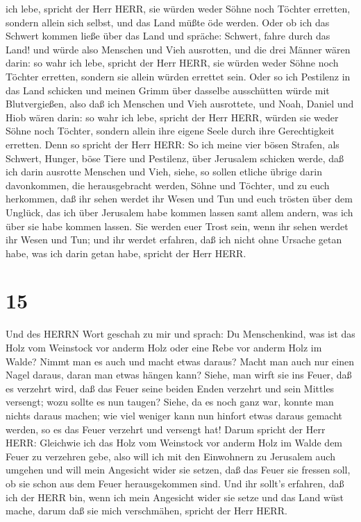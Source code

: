 ich lebe, spricht der Herr HERR, sie würden weder Söhne noch Töchter
erretten, sondern allein sich selbst, und das Land müßte öde werden.
 Oder ob ich das Schwert kommen ließe über das Land und
spräche: Schwert, fahre durch das Land! und würde also Menschen und Vieh
ausrotten,  und die drei Männer wären darin: so wahr ich
lebe, spricht der Herr HERR, sie würden weder Söhne noch Töchter
erretten, sondern sie allein würden errettet sein.  Oder so
ich Pestilenz in das Land schicken und meinen Grimm über dasselbe
ausschütten würde mit Blutvergießen, also daß ich Menschen und Vieh
ausrottete,  und Noah, Daniel und Hiob wären darin: so wahr
ich lebe, spricht der Herr HERR, würden sie weder Söhne noch Töchter,
sondern allein ihre eigene Seele durch ihre Gerechtigkeit erretten.
 Denn so spricht der Herr HERR: So ich meine vier bösen
Strafen, als Schwert, Hunger, böse Tiere und Pestilenz, über Jerusalem
schicken werde, daß ich darin ausrotte Menschen und Vieh, 
siehe, so sollen etliche übrige darin davonkommen, die herausgebracht
werden, Söhne und Töchter, und zu euch herkommen, daß ihr sehen werdet
ihr Wesen und Tun und euch trösten über dem Unglück, das ich über
Jerusalem habe kommen lassen samt allem andern, was ich über sie habe
kommen lassen.  Sie werden euer Trost sein, wenn ihr sehen
werdet ihr Wesen und Tun; und ihr werdet erfahren, daß ich nicht ohne
Ursache getan habe, was ich darin getan habe, spricht der Herr HERR.

\hypertarget{section-14}{%
\section{15}\label{section-14}}

 Und des HERRN Wort geschah zu mir und sprach: 
Du Menschenkind, was ist das Holz vom Weinstock vor anderm Holz oder
eine Rebe vor anderm Holz im Walde?  Nimmt man es auch und
macht etwas daraus? Macht man auch nur einen Nagel daraus, daran man
etwas hängen kann?  Siehe, man wirft sie ins Feuer, daß es
verzehrt wird, daß das Feuer seine beiden Enden verzehrt und sein
Mittles versengt; wozu sollte es nun taugen?  Siehe, da es
noch ganz war, konnte man nichts daraus machen; wie viel weniger kann
nun hinfort etwas daraus gemacht werden, so es das Feuer verzehrt und
versengt hat!  Darum spricht der Herr HERR: Gleichwie ich
das Holz vom Weinstock vor anderm Holz im Walde dem Feuer zu verzehren
gebe, also will ich mit den Einwohnern zu Jerusalem auch umgehen
 und will mein Angesicht wider sie setzen, daß das Feuer sie
fressen soll, ob sie schon aus dem Feuer herausgekommen sind. Und ihr
sollt's erfahren, daß ich der HERR bin, wenn ich mein Angesicht wider
sie setze  und das Land wüst mache, darum daß sie mich
verschmähen, spricht der Herr HERR.

